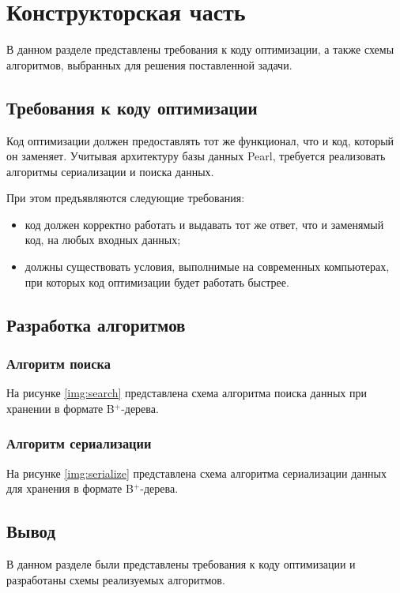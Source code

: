 \chapter{Конструкторская часть}

В данном разделе представлены требования к коду оптимизации, а также схемы алгоритмов, выбранных для решения поставленной задачи.

\section{Требования к коду оптимизации}

Код оптимизации должен предоставлять тот же функционал, что и код, который он заменяет. Учитывая архитектуру базы данных Pearl, требуется реализовать алгоритмы сериализации и поиска данных.

При этом предъявляются следующие требования:
\begin{itemize}
    \item код должен корректно работать и выдавать тот же ответ, что и заменямый код, на любых входных данных;
    \item должны существовать условия, выполнимые на современных компьютерах, при которых код оптимизации будет работать быстрее.
\end{itemize}

\clearpage

\section{Разработка алгоритмов}

\subsection{Алгоритм поиска}

На рисунке \ref{img:search} представлена схема алгоритма поиска данных при хранении в формате B$^+$-дерева.


\clearpage

\subsection{Алгоритм сериализации}

На рисунке \ref{img:serialize} представлена схема алгоритма сериализации данных для хранения в формате B$^+$-дерева.


\section*{Вывод}

В данном разделе были представлены требования к коду оптимизации и разработаны схемы реализуемых алгоритмов.

